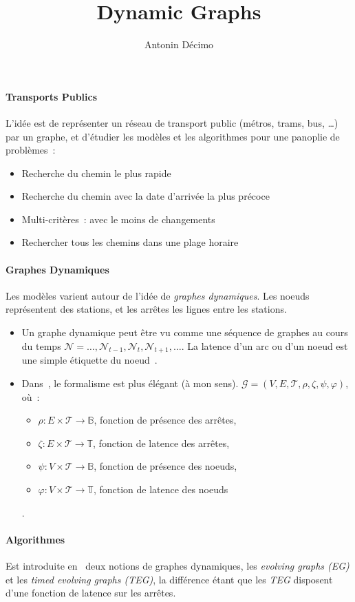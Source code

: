 \documentclass[11pt,a4paper]{article}
\title{Dynamic Graphs}
\author{Antonin Décimo}
\begin{document}
\paragraph{Transports Publics}
L'idée est de représenter un réseau de transport public (métros,
trams, bus, …) par un graphe, et d'étudier les modèles et les
algorithmes pour une panoplie de problèmes~:
\begin{itemize}
\item Recherche du chemin le plus rapide
\item Recherche du chemin avec la date d'arrivée la plus précoce
\item Multi-critères~: avec le moins de changements
\item Rechercher tous les chemins dans une plage horaire
\end{itemize}


\paragraph{Graphes Dynamiques}
Les modèles varient autour de l'idée de \textit{graphes
  dynamiques}. Les noeuds représentent des stations, et les arrêtes
les lignes entre les stations.

\begin{itemize}
\item Un graphe dynamique peut être vu comme une séquence de graphes
  au cours du temps \(\mathcal{N} = \dots, \mathcal{N}_{t-1},
  \mathcal{N}_{t}, \mathcal{N}_{t+1}, \dots\). La latence d'un arc ou
  d'un noeud est une simple étiquette du noeud~\cite{xuan2003computing}.
\item Dans~\cite{casteigts2012time}, le formalisme est plus élégant (à
  mon sens).
  \(\mathcal{G} = (V, E, \mathcal{T}, \rho, \zeta, \psi, \varphi)\),
  où~:
  \begin{itemize}
  \item \(\rho : E \times \mathcal{T} \to \mathbb{B}\), fonction de
    présence des arrêtes,
  \item \(\zeta : E \times \mathcal{T} \to \mathbb{T}\), fonction de
    latence des arrêtes,
  \item \(\psi : V \times \mathcal{T} \to \mathbb{B}\), fonction de
    présence des noeuds,
  \item \(\varphi : V \times \mathcal{T} \to \mathbb{T}\), fonction de
    latence des noeuds
  \end{itemize}.
\end{itemize}

\paragraph{Algorithmes}
Est introduite en~\cite{xuan2003computing} deux notions de graphes
dynamiques, les \textit{evolving graphs (EG)} et les \textit{timed
  evolving graphs (TEG)}, la différence étant que les \textit{TEG}
disposent d'une fonction de latence sur les arrêtes.
\end{document}
